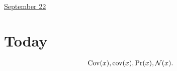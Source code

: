 \documentclass[11pt,letterpaper]{article}
\begin{document}
\href{run:2025-09-22.tex}{\Huge September 22} 

\section{Today}
$$
\mathrm{Cov}(x), \mathrm{cov}(x), \mathrm{Pr}(x), \mathcal{N}(x). 
$$


 

\end{document}
